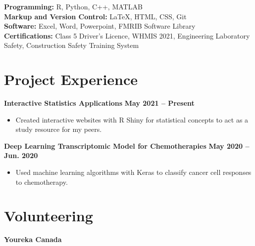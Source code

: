 \documentclass{article}
\begin{document}
\textbf{Programming:} R, Python, C++, MATLAB \\
\textbf{Markup and Version Control:} \LaTeX, HTML, CSS, Git \\
\textbf{Software:} Excel, Word, Powerpoint, FMRIB Software Library \\
\textbf{Certifications:} Class 5 Driver's Licence, WHMIS 2021, Engineering Laboratory Safety, Construction Safety Training System


\section*{\textcolor{my_colour}{Project Experience}}
\vspace{-.25em} \hrulefill \vspace{.75em}

\textbf{Interactive Statistics Applications} \hfill \textbf{May 2021 -- Present}
\begin{itemize}
    \item Created interactive websites with R Shiny for statistical concepts to act as a study resource for my peers.
\end{itemize}

\textbf{Deep Learning Transcriptomic Model for Chemotherapies} \hfill \textbf{May 2020 -- Jun. 2020}
\begin{itemize}
    \item Used machine learning algorithms with Keras to classify cancer cell responses to chemotherapy.
\end{itemize}


\section*{\textcolor{my_colour}{Volunteering}}
\vspace{-.25em} \hrulefill \vspace{.75em}

\textbf{Youreka Canada}
\end{document}

